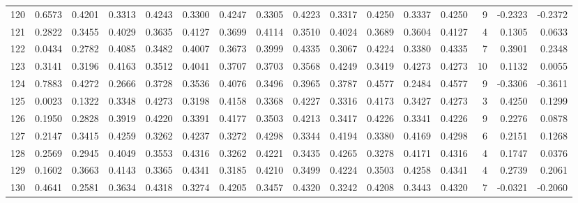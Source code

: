 \begin{tabular}{lrrrrrrrrrrrrrrr}
120 &      0.6573 &  0.4201 &  0.3313 &  0.4243 &  0.3300 &  0.4247 &  0.3305 &  0.4223 &  0.3317 &  0.4250 &   0.3337 &     0.4250 &      9 &                   -0.2323 &                    -0.2372 \\
121 &      0.2822 &  0.3455 &  0.4029 &  0.3635 &  0.4127 &  0.3699 &  0.4114 &  0.3510 &  0.4024 &  0.3689 &   0.3604 &     0.4127 &      4 &                    0.1305 &                     0.0633 \\
122 &      0.0434 &  0.2782 &  0.4085 &  0.3482 &  0.4007 &  0.3673 &  0.3999 &  0.4335 &  0.3067 &  0.4224 &   0.3380 &     0.4335 &      7 &                    0.3901 &                     0.2348 \\
123 &      0.3141 &  0.3196 &  0.4163 &  0.3512 &  0.4041 &  0.3707 &  0.3703 &  0.3568 &  0.4249 &  0.3419 &   0.4273 &     0.4273 &     10 &                    0.1132 &                     0.0055 \\
124 &      0.7883 &  0.4272 &  0.2666 &  0.3728 &  0.3536 &  0.4076 &  0.3496 &  0.3965 &  0.3787 &  0.4577 &   0.2484 &     0.4577 &      9 &                   -0.3306 &                    -0.3611 \\
125 &      0.0023 &  0.1322 &  0.3348 &  0.4273 &  0.3198 &  0.4158 &  0.3368 &  0.4227 &  0.3316 &  0.4173 &   0.3427 &     0.4273 &      3 &                    0.4250 &                     0.1299 \\
126 &      0.1950 &  0.2828 &  0.3919 &  0.4220 &  0.3391 &  0.4177 &  0.3503 &  0.4213 &  0.3417 &  0.4226 &   0.3341 &     0.4226 &      9 &                    0.2276 &                     0.0878 \\
127 &      0.2147 &  0.3415 &  0.4259 &  0.3262 &  0.4237 &  0.3272 &  0.4298 &  0.3344 &  0.4194 &  0.3380 &   0.4169 &     0.4298 &      6 &                    0.2151 &                     0.1268 \\
128 &      0.2569 &  0.2945 &  0.4049 &  0.3553 &  0.4316 &  0.3262 &  0.4221 &  0.3435 &  0.4265 &  0.3278 &   0.4171 &     0.4316 &      4 &                    0.1747 &                     0.0376 \\
129 &      0.1602 &  0.3663 &  0.4143 &  0.3365 &  0.4341 &  0.3185 &  0.4210 &  0.3499 &  0.4224 &  0.3503 &   0.4258 &     0.4341 &      4 &                    0.2739 &                     0.2061 \\
130 &      0.4641 &  0.2581 &  0.3634 &  0.4318 &  0.3274 &  0.4205 &  0.3457 &  0.4320 &  0.3242 &  0.4208 &   0.3443 &     0.4320 &      7 &                   -0.0321 &                    -0.2060 \\

\end{tabular}
